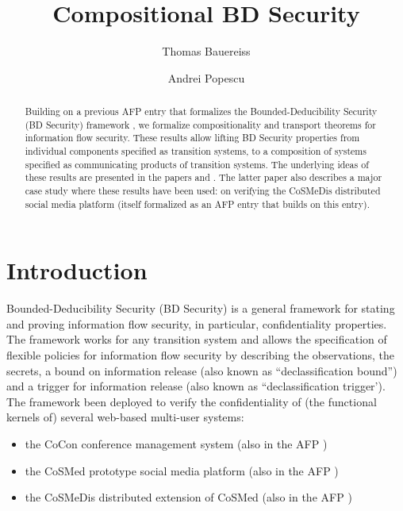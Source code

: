 \documentclass[11pt,a4paper]{article}
\begin{document}
\title{Compositional BD Security}
\author{Thomas Bauereiss \and Andrei Popescu}
\maketitle

\begin{abstract}
Building on a previous AFP entry \cite{BDSecurity-AFP} that formalizes
the Bounded-Deducibility Security (BD Security) framework \cite{BDsecurity-ITP2021},
we formalize compositionality and transport theorems for information flow security. These results allow lifting
BD Security properties from individual components specified as transition systems,
to a composition of systems specified as communicating products of transition systems.
The underlying ideas of these results are presented in
the papers \cite{BDsecurity-ITP2021} and \cite{cosmedis-SandP2017}. The latter paper also describes a major case study where these results have been used: on verifying the CoSMeDis distributed social media platform (itself formalized as an AFP entry \cite{cosmedis-AFP} that builds on this entry).
\end{abstract}

\tableofcontents

\section{Introduction}



Bounded-Deducibility Security (BD Security) \cite{BDsecurity-ITP2021} is a general
framework for stating and proving information flow security, in particular, confidentiality properties.  The framework works for any transition system and allows the specification of flexible policies for information flow security by describing the observations, the secrets, a bound on information release (also known as ``declassification bound'') and a trigger for information release (also known as ``declassification trigger').  The framework been deployed to verify the confidentiality of (the functional kernels of) several web-based multi-user systems:
\begin{itemize}
	\item the CoCon conference management system \cite{cocon-CAV2014,cocon-JAR2021} (also in the AFP \cite{cocon-AFP})
	\item the CoSMed prototype social media platform
	\cite{cosmed-itp2016,cosmed-jar2018}
	(also in the AFP \cite{cosmed-AFP})
	\item the CoSMeDis distributed extension of CoSMed
	\cite{cosmedis-SandP2017}
	(also in the AFP \cite{cosmedis-AFP})
\end{itemize}
\end{document}
